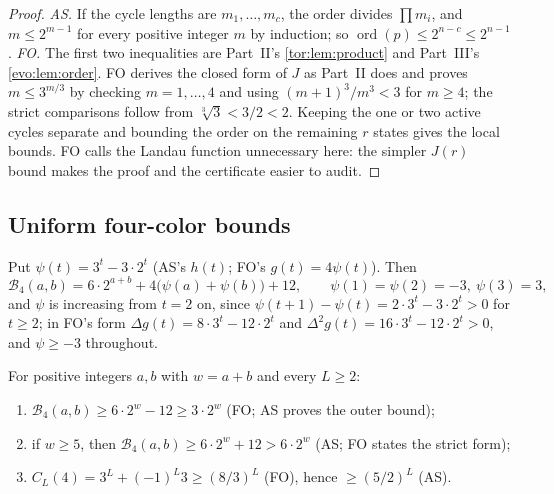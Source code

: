 \documentclass[11pt,a4paper]{article}
\numberwithin{equation}{section}
\theoremstyle{definition}
\theoremstyle{remark}
\newcommand{\ord}{\operatorname{ord}}
\newcommand{\Bip}{\mathcal B}
\begin{document}
\begin{proof}
\emph{AS.} If the cycle lengths are $m_1,\ldots,m_c$, the order divides
$\prod m_i$, and $m\le2^{m-1}$ for every positive integer $m$ by induction;
so $\ord(p)\le2^{n-c}\le2^{n-1}$. \emph{FO.} The first two inequalities are
Part~II's \cref{tor:lem:product} and Part~III's \cref{evo:lem:order}. FO
derives the closed form of $J$ as Part~II does and proves $m\le3^{m/3}$ by
checking $m=1,\ldots,4$ and using $(m+1)^3/m^3<3$ for $m\ge4$; the strict
comparisons follow from $\sqrt[3]3<3/2<2$. Keeping the one or two active
cycles separate and bounding the order on the remaining $r$ states gives the
local bounds. FO calls the Landau function unnecessary here: the simpler
$J(r)$ bound makes the proof and the certificate easier to audit.
\end{proof}

\subsection{Uniform four-color bounds}\label{fo:sec:bounds}

Put $\psi(t)=3^t-3\cdot2^t$ (AS's $h(t)$; FO's $g(t)=4\psi(t)$). Then
\begin{equation}\label{fo:eq:psi}
 \Bip_4(a,b)=6\cdot2^{a+b}+4\bigl(\psi(a)+\psi(b)\bigr)+12,\qquad
 \psi(1)=\psi(2)=-3,\ \psi(3)=3,
\end{equation}
and $\psi$ is increasing from $t=2$ on, since $\psi(t+1)-\psi(t)=2\cdot3^t-3\cdot2^t>0$
for $t\ge2$; in FO's form $\Delta g(t)=8\cdot3^t-12\cdot2^t$ and
$\Delta^2g(t)=16\cdot3^t-12\cdot2^t>0$, and $\psi\ge-3$ throughout.

\begin{lemma}\label{fo:lem:counts}
For positive integers $a,b$ with $w=a+b$ and every $L\ge2$:
\begin{enumerate}[label=(\alph*)]
\item $\Bip_4(a,b)\ge6\cdot2^w-12\ge3\cdot2^w$ \textup{(FO; AS proves the outer bound)};
\item if $w\ge5$, then $\Bip_4(a,b)\ge6\cdot2^w+12>6\cdot2^w$ \textup{(AS; FO states the strict form)};
\item $C_L(4)=3^L+(-1)^L3\ge(8/3)^L$ \textup{(FO)}, hence $\ge(5/2)^L$ \textup{(AS)}.
\end{enumerate}
\end{lemma}
\end{document}
